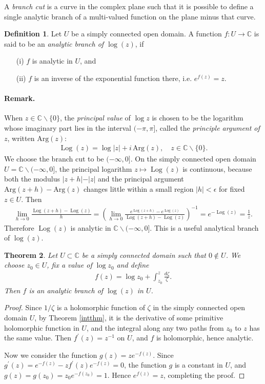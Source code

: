 \documentclass{article}
\numberwithin{equation}{section}
\newcommand{\bbC}{\mathbb{C}}
\DeclareMathOperator{\Log}{Log}
\theoremstyle{plain}
\newtheorem{theorem}{Theorem}[section]
\theoremstyle{definition}
\newtheorem{definition}[theorem]{Definition}
\begin{document}
A \textit{branch cut} is a curve in the complex plane such that it is possible to define a single analytic branch of a multi-valued function on the plane minus that curve. 

\begin{definition}
Let $U$ be a simply connected open domain. A function $f:U\to\bbC$ is said to be an \textit{analytic branch of $\log(z)$}, if
\begin{itemize}
\item[(i)] $f$ is analytic in $U$, and
\item[(ii)] $f$ is an inverse of the exponential function there, i.e. $e^{f(z)}=z$.
\end{itemize}
\end{definition}
\paragraph{Remark.} When $z\in\bbC\backslash\{0\}$, the \textit{principal value} of $\log z$ is chosen to be the logarithm whose imaginary part lies in the interval $(-\pi,\pi]$, called the \textit{principle argument of $z$}, written $\mathrm{Arg}(z)$:
\begin{align*}
	\Log(z)=\log\vert z\vert + i\,\mathrm{Arg}(z),\quad z\in\bbC\backslash\{0\}.
\end{align*}
We choose the branch cut to be $(-\infty,0]$. On the simply connected open domain $U=\bbC\backslash(-\infty,0]$, the principal logarithm $z\mapsto\Log(z)$ is continuous, because both the modulus $\vert z+h\vert-\vert z\vert$ and the principal argument $\mathrm{Arg}(z+h)-\mathrm{Arg}(z)$ changes little within a small region $\vert h\vert<\epsilon$ for fixed $z\in U$. Then 
\begin{align*}
	\lim_{h\to 0}\frac{\Log(z+h)-\Log(z)}{h}=\left(\lim_{h\to 0}\frac{e^{\Log(z+h)}-e^{\Log(z)}}{\Log(z+h)-\Log(z)}\right)^{-1}=e^{-\Log(z)}=\frac{1}{z}.
\end{align*}
Therefore $\Log(z)$ is analytic in $\bbC\backslash(-\infty,0]$. This is a useful analytical branch of $\log(z)$.

\begin{theorem}
Let $U\subset\bbC$ be a simply connected domain such that $0\notin U$. We choose $z_0\in U$, fix a value of $\log z_0$ and define
\begin{align*}
	f(z)=\log z_0+\int_{z_0}^z\frac{d\zeta}{\zeta}.
\end{align*}
Then $f$ is an analytic branch of $\log(z)$ in $U$.
\end{theorem}
\begin{proof}
Since $1/\zeta$ is a holomorphic function of $\zeta$ in the simply connected open domain $U$, by Theorem \ref{intthm}, it is the derivative of some primitive holomorphic function in $U$, and the integral along any two paths from $z_0$ to $z$ has the same value. Then $f^\prime(z)=z^{-1}$ on $U$, and $f$ is holomorphic, hence analytic.

Now we consider the function $g(z)=ze^{-f(z)}$. Since $g^\prime(z)=e^{-f(z)}-zf^\prime(z)e^{-f(z)}=0$, the function $g$ is a constant in $U$, and $g(z)=g(z_0)=z_0e^{-f(z_0)}=1$. Hence $e^{f(z)}=z$, completing the proof.
\end{proof}
\end{document}
